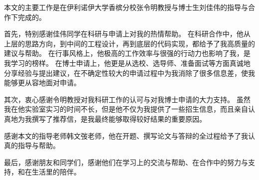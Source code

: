
\begin{acknowledgements}

本文的主要工作是在伊利诺伊大学香槟分校张令明教授与博士生刘佳伟的指导与合作下完成的。

首先，特别感谢佳伟同学在科研与申请上对我的热情帮助。
在科研合作中，他从上层的思路方向，到中间的工程设计，再到底层的代码实现，都给予了我高质量的建议与帮助。
在行事风格上，他极高的工作效率与很强的行动力也影响了我，是我学习的榜样。
在博士申请上，他更是从选校、选导师、准备面试等方面真诚地分享经验与提出建议，在不确定性较大的申请过程中为我消除了很多信息差，使我能够更从容地面对申请。

其次，衷心感谢令明教授对我科研工作的认可与对我博士申请的大力支持。
虽然我在他实验室实习的时间不长，但是他不仅为我提供了一些招生信息，而且亲自认真地为我撰写了推荐信，是我最终能够取得较好结果的重要原因。

感谢本文的指导老师韩文弢老师，他在开题、撰写论文与答辩的全过程给予了我认真的指导与帮助。

最后，感谢朋友和同学们，感谢他们在学习上的交流与帮助、在合作中的努力与支持，和在生活里的陪伴。

\end{acknowledgements}
